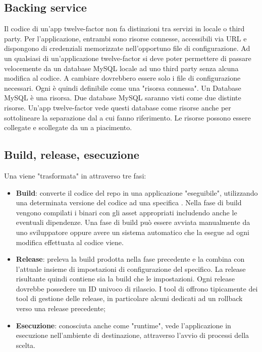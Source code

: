 \documentclass[PianoDiQualifica.tex]{subfiles}
\begin{document}
\subsection{Backing service}
Il codice di un'app twelve-factor non fa distinzioni tra servizi in locale o third party. Per l'applicazione, entrambi sono risorse connesse, accessibili via URL e dispongono di credenziali memorizzate nell'opportuno file di configurazione. Ad un qualsiasi  di un'applicazione twelve-factor si deve poter permettere di passare velocemente da un database MySQL locale ad uno third party senza alcuna modifica al codice. A cambiare dovrebbero essere solo i file di configurazione necessari.
Ogni  è quindi definibile come una "risorsa connessa". Un Database MySQL è una risorsa. Due database MySQL saranno visti come due distinte risorse. Un'app twelve-factor vede questi database come risorse anche per sottolineare la separazione dal  a cui fanno riferimento. Le risorse possono essere collegate e scollegate da un  a piacimento.

\subsection{Build, release, esecuzione}
Una  viene "trasformata" in  attraverso tre fasi:
\begin{itemize}
\item \textbf{Build}: converte il codice del repo in una applicazione "eseguibile", utilizzando una determinata versione del codice ad una specifica . Nella fase di build vengono compilati i binari con gli asset appropriati includendo anche le eventuali dipendenze. Una fase di build può essere avviata manualmente da uno sviluppatore oppure avere un sistema automatico che la esegue ad ogni modifica effettuata al codice viene.
\item \textbf{Release}: preleva la build prodotta nella fase precedente e la combina con l'attuale insieme di impostazioni di configurazione del  specifico. La release risultante quindi contiene sia la build che le impostazioni. Ogni release dovrebbe possedere un ID univoco di rilascio. I tool di  offrono tipicamente dei tool di gestione delle release, in particolare alcuni dedicati ad un rollback verso una release precedente;
\item \textbf{Esecuzione}: conosciuta anche come "runtime", vede l'applicazione in esecuzione nell'ambiente di destinazione, attraverso l'avvio di processi della  scelta.
\end{itemize}
\end{document}
